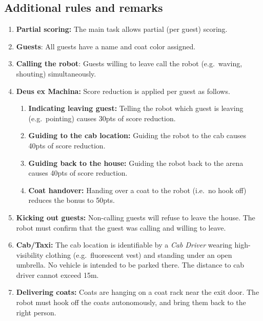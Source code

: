 \subsection{Additional rules and remarks}
\begin{enumerate}[nosep]
	\item \textbf{Partial scoring:} The main task allows partial (per guest) scoring.

	\item \textbf{Guests}: All guests have a name and coat color assigned.

	\item \textbf{Calling the robot}: Guests willing to leave call the robot (e.g.~waving, shouting) simultaneously.

	\item \textbf{Deus ex Machina:} Score reduction is applied per guest as follows.
	\begin{enumerate}[nosep]
		\item \textbf{Indicating leaving guest:} Telling the robot which guest is leaving (e.g.~pointing) causes 30pts of score reduction.

		\item \textbf{Guiding to the cab location:} Guiding the robot to the cab causes 40pts of score reduction.

		\item \textbf{Guiding back to the house:} Guiding the robot back to the arena causes 40pts of score reduction.

		\item \textbf{Coat handover:} Handing over a coat to the robot (i.e.~no hook off) reduces the bonus to 50pts.
	\end{enumerate}

	\item \textbf{Kicking out guests:} Non-calling guests will refuse to leave the house. The robot must confirm that the guest was calling and willing to leave.

	\item \textbf{Cab/Taxi:} The cab location is identifiable by a \emph{Cab Driver} wearing high-visibility clothing (e.g.~fluorescent vest) and standing under an open umbrella.
	No vehicle is intended to be parked there.
	The distance to cab driver cannot exceed 15m.

	\item \textbf{Delivering coats:} Coats are hanging on a coat rack near the exit door.
	The robot must hook off the coats autonomously, and bring them back to the right person.
\end{enumerate}


